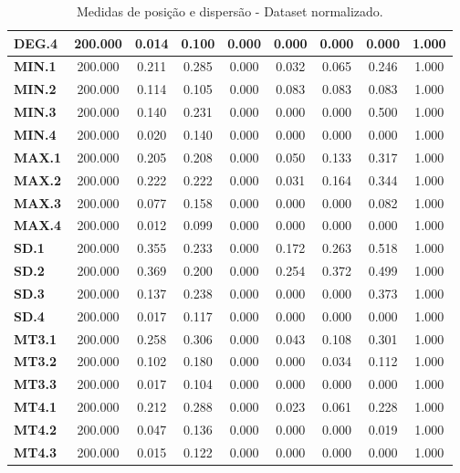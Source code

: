 \documentclass[
	article,			%
	11pt,				%
	oneside,			%
	a4paper,			%
	english,			%
	brazil,				%
	sumario=tradicional
	]{abntex2}
\begin{document}
\begin{table}[H]
\begin{tabular}{l|c|c|c|c|c|c|c|c|}
\multicolumn{1}{|l|}{\textbf{DEG.4}}  & 200.000 & 0.014 & 0.100 & 0.000 & 0.000 & 0.000 & 0.000 & 1.000 \\ \hline
\multicolumn{1}{|l|}{\textbf{MIN.1}}  & 200.000 & 0.211 & 0.285 & 0.000 & 0.032 & 0.065 & 0.246 & 1.000 \\ \hline
\multicolumn{1}{|l|}{\textbf{MIN.2}}  & 200.000 & 0.114 & 0.105 & 0.000 & 0.083 & 0.083 & 0.083 & 1.000 \\ \hline
\multicolumn{1}{|l|}{\textbf{MIN.3}}  & 200.000 & 0.140 & 0.231 & 0.000 & 0.000 & 0.000 & 0.500 & 1.000 \\ \hline
\multicolumn{1}{|l|}{\textbf{MIN.4}}  & 200.000 & 0.020 & 0.140 & 0.000 & 0.000 & 0.000 & 0.000 & 1.000 \\ \hline
\multicolumn{1}{|l|}{\textbf{MAX.1}}  & 200.000 & 0.205 & 0.208 & 0.000 & 0.050 & 0.133 & 0.317 & 1.000 \\ \hline
\multicolumn{1}{|l|}{\textbf{MAX.2}}  & 200.000 & 0.222 & 0.222 & 0.000 & 0.031 & 0.164 & 0.344 & 1.000 \\ \hline
\multicolumn{1}{|l|}{\textbf{MAX.3}}  & 200.000 & 0.077 & 0.158 & 0.000 & 0.000 & 0.000 & 0.082 & 1.000 \\ \hline
\multicolumn{1}{|l|}{\textbf{MAX.4}}  & 200.000 & 0.012 & 0.099 & 0.000 & 0.000 & 0.000 & 0.000 & 1.000 \\ \hline
\multicolumn{1}{|l|}{\textbf{SD.1}}   & 200.000 & 0.355 & 0.233 & 0.000 & 0.172 & 0.263 & 0.518 & 1.000 \\ \hline
\multicolumn{1}{|l|}{\textbf{SD.2}}   & 200.000 & 0.369 & 0.200 & 0.000 & 0.254 & 0.372 & 0.499 & 1.000 \\ \hline
\multicolumn{1}{|l|}{\textbf{SD.3}}   & 200.000 & 0.137 & 0.238 & 0.000 & 0.000 & 0.000 & 0.373 & 1.000 \\ \hline
\multicolumn{1}{|l|}{\textbf{SD.4}}   & 200.000 & 0.017 & 0.117 & 0.000 & 0.000 & 0.000 & 0.000 & 1.000 \\ \hline
\multicolumn{1}{|l|}{\textbf{MT3.1}}  & 200.000 & 0.258 & 0.306 & 0.000 & 0.043 & 0.108 & 0.301 & 1.000 \\ \hline
\multicolumn{1}{|l|}{\textbf{MT3.2}}  & 200.000 & 0.102 & 0.180 & 0.000 & 0.000 & 0.034 & 0.112 & 1.000 \\ \hline
\multicolumn{1}{|l|}{\textbf{MT3.3}}  & 200.000 & 0.017 & 0.104 & 0.000 & 0.000 & 0.000 & 0.000 & 1.000 \\ \hline
\multicolumn{1}{|l|}{\textbf{MT4.1}}  & 200.000 & 0.212 & 0.288 & 0.000 & 0.023 & 0.061 & 0.228 & 1.000 \\ \hline
\multicolumn{1}{|l|}{\textbf{MT4.2}}  & 200.000 & 0.047 & 0.136 & 0.000 & 0.000 & 0.000 & 0.019 & 1.000 \\ \hline
\multicolumn{1}{|l|}{\textbf{MT4.3}}  & 200.000 & 0.015 & 0.122 & 0.000 & 0.000 & 0.000 & 0.000 & 1.000 \\ \hline
\end{tabular}
\caption{Medidas de posição e dispersão - Dataset normalizado.}
\label{tab:est_norm}
\end{table}
\end{document}
